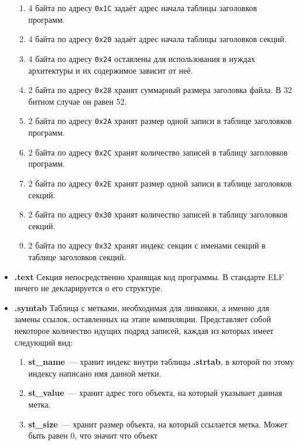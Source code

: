 \documentclass[14pt, russian, onesize]{extreport}
\begin{document}
\begin{itemize}
\begin{enumerate}
            \item 4 байта по адресу \texttt{0x1C} задаёт адрес
                начала таблицы заголовков программ.
            \item 4 байта по адресу \texttt{0x20} задаёт адрес
                начала таблицы заголовков секций.
            \item 4 байта по адресу \texttt{0x24} оставлены для использования
                в нуждах архитектуры и их содержимое зависит от неё.
            \item 2 байта по адресу \texttt{0x28} хранят суммарный
                размера заголовка файла. В 32 битном случае он равен 52.
            \item 2 байта по адресу \texttt{0x2A} хранят размер одной записи
                в таблице заголовков программ.
            \item 2 байта по адресу \texttt{0x2C} хранят количество
                записей в таблицу заголовков программ.
            \item 2 байта по адресу \texttt{0x2E} хранят размер одной записи
                в таблице заголовков секций.
            \item 2 байта по адресу \texttt{0x30} хранят количество
                записей в таблицу заголовков секций.
            \item 2 байта по адресу \texttt{0x32} хранят индекс
                секции с именами секций в таблице заголовков секций.
        \end{enumerate}
    \item \textbf{.text}
        Секция непосредственно хранящая код программы. В стандарте
        ELF ничего не декларируется о его структуре.
    \item \textbf{.symtab}
        Таблица с метками, необходимая для линковки, а именно для замены
        ссылок, оставленных на этапе компиляции.
        Представляет собой некоторое количество идущих подряд
        записей, каждая из которых имеет следующий вид:
        \begin{enumerate}
            \item \textbf{st\_name}~--- хранит индекс внутри таблицы \textbf{.strtab},
                в которой по этому индексу написано имя данной метки.
            \item \textbf{st\_value}~--- хранит адрес того объекта, на который
                указывает данная метка.
            \item \textbf{st\_size}~--- хранит размер объекта, на который
                ссылается метка. Может быть равен 0, что значит что объект

\end{enumerate}
\end{itemize}
\end{document}
